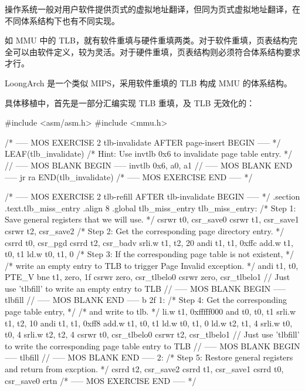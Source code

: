 操作系统一般对用户软件提供页式的虚拟地址翻译，但同为页式虚拟地址翻译，在不同体系结构下也有不同实现。

如 MMU 中的 TLB，就有软件重填与硬件重填两类。对于软件重填，页表结构完全可以由软件定义，较为灵活。对于硬件重填，页表结构则必须符合体系结构要求才行。

LoongArch 是一个类似 MIPS，采用软件重填的 TLB 构成 MMU 的体系结构。

具体移植中，首先是一部分汇编实现 TLB 重填，及 TLB 无效化的：

\begin{CodeBlock}[language=BookLoongArch]
#include <asm/asm.h>
#include <mmu.h>

/* ----- MOS EXERCISE 2 tlb-invalidate AFTER page-insert BEGIN ----- */
LEAF(tlb_invalidate)
    /* Hint: Use invtlb 0x6 to invalidate page table entry. */
    // ----- MOS BLANK BEGIN -----
    invtlb  0x6, a0, a1
    // ----- MOS BLANK END -----
    jr      ra
END(tlb_invalidate)
/* ----- MOS EXERCISE END ----- */

/* ----- MOS EXERCISE 2 tlb-refill AFTER tlb-invalidate BEGIN ----- */
.section .text.tlb_miss_entry
.align 8
.global tlb_miss_entry
tlb_miss_entry:
    /* Step 1: Save general registers that we will use. */
    csrwr   t0, csr_save0
    csrwr   t1, csr_save1
    csrwr   t2, csr_save2
    /* Step 2: Get the corresponding page directory entry. */
    csrrd   t0, csr_pgd
    csrrd   t2, csr_badv
    srli.w  t1, t2, 20
    andi    t1, t1, 0xffc
    add.w   t1, t0, t1
    ld.w    t0, t1, 0
    /* Step 3: If the corresponding page table is not existent, */
    /* write an empty entry to TLB to trigger Page Invalid exception. */
    andi    t1, t0, PTE_V
    bne     t1, zero, 1f
    csrwr   zero, csr_tlbelo0
    csrwr   zero, csr_tlbelo1
    // Just use 'tlbfill' to write an empty entry to TLB
    // ----- MOS BLANK BEGIN -----
    tlbfill
    // ----- MOS BLANK END -----
    b       2f
1:
    /* Step 4: Get the corresponding page table entry, */
    /* and write to tlb. */
    li.w    t1, 0xfffff000
    and     t0, t0, t1
    srli.w  t1, t2, 10
    andi    t1, t1, 0xff8
    add.w   t1, t0, t1
    ld.w    t0, t1, 0
    ld.w    t2, t1, 4
    srli.w  t0, t0, 4
    srli.w  t2, t2, 4
    csrwr   t0, csr_tlbelo0
    csrwr   t2, csr_tlbelo1
    // Just use 'tlbfill' to write the corresponding page table entry to TLB
    // ----- MOS BLANK BEGIN -----
    tlbfill
    // ----- MOS BLANK END -----
2:
    /* Step 5: Restore general registers and return from excption. */
    csrrd   t2, csr_save2
    csrrd   t1, csr_save1
    csrrd   t0, csr_save0
    ertn
/* ----- MOS EXERCISE END ----- */

\end{CodeBlock}

